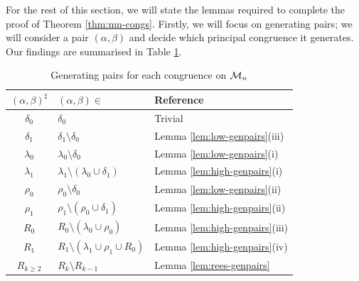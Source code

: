 For the rest of this section, we will state the lemmas required to complete the
proof of Theorem \ref{thm:mn-congs}.  Firstly, we will focus on generating
pairs; we will consider a pair $(\alpha, \beta)$ and decide which principal
congruence it generates.  Our findings are summarised in Table
\ref{tab:mn-genpairs}.

\begin{table}[h]
  \renewcommand\arraystretch{1.0}
  \centering
  \begin{tabular}{| c | l | l |}
    \hline
    $(\alpha,\beta)^\sharp$ & $(\alpha,\beta) \in$ & Reference \\
    \hline
    $\delta_0$   & $\delta_0$
                 & Trivial                             \\
    $\delta_1$   & $\delta_1 \setminus \delta_0$
                 & Lemma \ref{lem:low-genpairs}(iii)  \\
    $\lambda_0$  & $\lambda_0 \setminus \delta_0$
                 & Lemma \ref{lem:low-genpairs}(i)    \\
    $\lambda_1$  & $\lambda_1 \setminus (\lambda_0 \cup \delta_1)$
                 & Lemma \ref{lem:high-genpairs}(i)   \\
    $\rho_0$     & $\rho_0 \setminus \delta_0$
                 & Lemma \ref{lem:low-genpairs}(ii)   \\
    $\rho_1$     & $\rho_1 \setminus (\rho_0 \cup \delta_1)$
                 & Lemma \ref{lem:high-genpairs}(ii)  \\
    $R_0$        & $R_0 \setminus (\lambda_0 \cup \rho_0)$
                 & Lemma \ref{lem:high-genpairs}(iii) \\
    $R_1$        & $R_1 \setminus (\lambda_1 \cup \rho_1 \cup R_0)$
                 & Lemma \ref{lem:high-genpairs}(iv)  \\
    $R_{k \geq 2}$ & $R_k \setminus R_{k-1}$
                 & Lemma \ref{lem:rees-genpairs}       \\
    \hline
  \end{tabular}
  \caption{Generating pairs for each congruence on $\mathcal{M}_n$}
  \label{tab:mn-genpairs}
\end{table}

